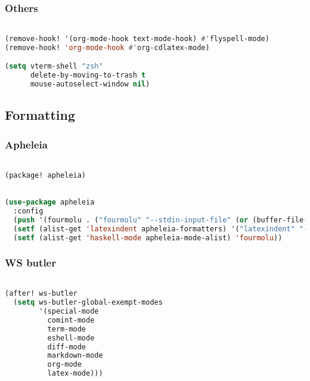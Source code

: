 \documentclass[11pt]{article}
\begin{document}
\subsubsection{Others}
\label{sec:others}
\begin{lstlisting}[language=Lisp]%! Someone please complete this list for me

(remove-hook! '(org-mode-hook text-mode-hook) #'flyspell-mode)
(remove-hook! 'org-mode-hook #'org-cdlatex-mode)

(setq vterm-shell "zsh"
      delete-by-moving-to-trash t
      mouse-autoselect-window nil)
\end{lstlisting}


\subsection{Formatting}
\label{sec:formatting}


\subsubsection{Apheleia}
\label{sec:apheleia}
\begin{lstlisting}[language=Lisp]%! Someone please complete this list for me

(package! apheleia)
\end{lstlisting}

\begin{lstlisting}[language=Lisp]%! Someone please complete this list for me

(use-package apheleia
  :config
  (push '(fourmolu . ("fourmolu" "--stdin-input-file" (or (buffer-file-name) (buffer-name)))) apheleia-formatters)
  (setf (alist-get 'latexindent apheleia-formatters) '("latexindent" "-y=defaultIndent:'  '" "--logfile=/dev/null"))
  (setf (alist-get 'haskell-mode apheleia-mode-alist) 'fourmolu))
\end{lstlisting}

\subsubsection{WS butler}
\label{sec:ws-butler}
\begin{lstlisting}[language=Lisp]%! Someone please complete this list for me

(after! ws-butler
  (setq ws-butler-global-exempt-modes
        '(special-mode
          comint-mode
          term-mode
          eshell-mode
          diff-mode
          markdown-mode
          org-mode
          latex-mode)))
\end{lstlisting}
\end{document}
